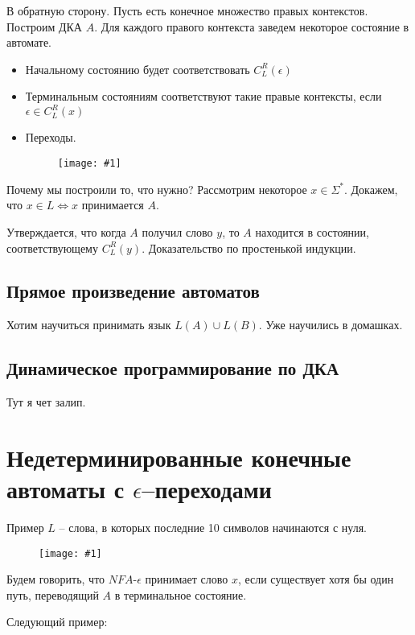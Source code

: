 \documentclass[fleqn, 12pt]{article}
\newcommand{\image}[2] { \begin{figure}[h!] \centering	\texttt{[image: \#1]}  \end{figure} }
\begin{document}
В обратную сторону. Пусть есть конечное множество правых контекстов. Построим ДКА $ A $. Для каждого правого контекста заведем некоторое состояние в автомате.

\begin{itemize}
	\item Начальному состоянию будет соответствовать $ C_L^R(\epsilon) $
	
	\item Терминальным состояниям соответствуют такие правые контексты, если $ \epsilon \in C_L^R(x) $
	
	\item Переходы. \image{img4.png}{0.5}
\end{itemize}

Почему мы построили то, что нужно? Рассмотрим некоторое $ x \in \Sigma^* $. Докажем, что $ x \in L \Leftrightarrow x $ принимается $ A $. 

Утверждается, что когда $ A $ получил слово $ y $, то $ A $ находится в состоянии, соответствующему $ C_L^R(y) $. Доказательство по простенькой индукции.



\subsection{Прямое произведение автоматов}

Хотим научиться принимать язык $ L(A) \cup L(B) $. Уже научились в домашках.

\bigskip

\subsection{Динамическое программирование по ДКА}

Тут я чет залип. 


\section{Недетерминированные конечные автоматы с $ \epsilon $--переходами}

Пример $ L $ -- слова, в которых последние 10 символов начинаются с нуля.

\image{image6.png}{0.5}

Будем говорить, что $ NFA$-$\epsilon$ принимает слово $ x $, если существует хотя бы один путь, переводящий $ A $ в терминальное состояние.

Следующий пример:
\end{document}
